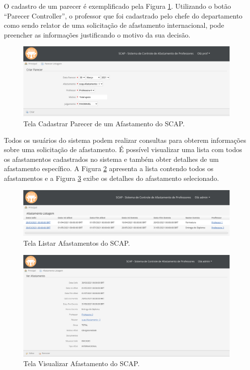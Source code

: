 O cadastro de um parecer é exemplificado pela Figura \ref{fig-projeto-cadastrar-parecer}. Utilizando o botão ``Parecer Controller'', o professor que foi cadastrado pelo chefe do departamento como sendo relator de uma solicitação de afastamento internacional, pode preencher as informações justificando o motivo da sua decisão. 

\begin{figure}[h]
	\centering
	\includegraphics[scale=0.33]{figuras/fig-projeto-cadastrar-parecer} 
	\caption{Tela Cadastrar Parecer de um Afastamento do SCAP.}
	\label{fig-projeto-cadastrar-parecer}
\end{figure}

Todos os usuários do sistema podem realizar consultas para obterem informações sobre uma solicitação de afastamento. É possível visualizar uma lista com todos os afastamentos cadastrados no sistema e também obter detalhes de um afastamento específico. A Figura \ref{fig-projeto-listar-afastamentos} apresenta a lista contendo todos os afastamentos e a Figura \ref{fig-projeto-ver-afastamento} exibe os detalhes do afastamento selecionado.  

\begin{figure}[h]
	\centering
	\includegraphics[scale=0.33]{figuras/fig-projeto-listar-afastamentos} 
	\caption{Tela Listar Afastamentos do SCAP.}
	\label{fig-projeto-listar-afastamentos}
\end{figure}

\begin{figure}[h]
	\centering
	\includegraphics[scale=0.33]{figuras/fig-projeto-ver-afastamento} 
	\caption{Tela Visualizar Afastamento do SCAP.}
	\label{fig-projeto-ver-afastamento}
\end{figure}

